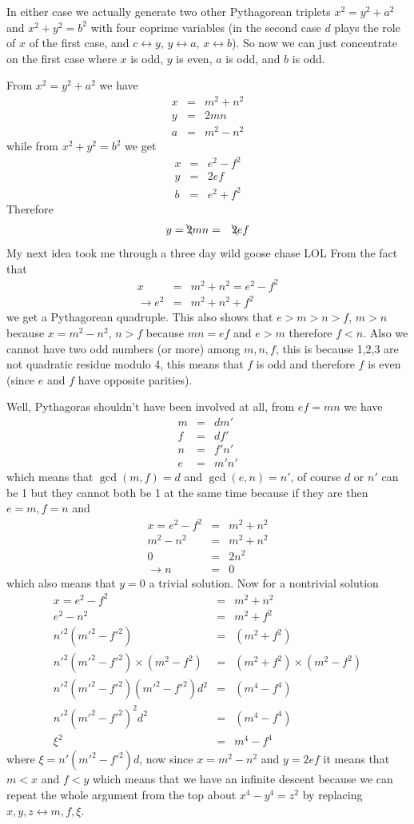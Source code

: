 \documentclass[aps,preprint,preprintnumbers,nofootinbib,showpacs,prd]{revtex4-1}
\newcommand{\nbea}{\begin{eqnarray*}}
\newcommand{\neea}{\end{eqnarray*}}
\begin{document}
In either case we actually generate two other Pythagorean triplets $x^2 = y^2 + a^2$ and $x^2 + y^2 = b^2$ with four coprime variables (in the second case $d$ plays the role of $x$ of the first case, and $c \leftrightarrow y$, $y \leftrightarrow a$, $x \leftrightarrow b$). So now we can just concentrate on the first case where $x$ is odd, $y$ is even, $a$ is odd, and $b$ is odd.

From $x^2 = y^2 + a^2$ we have 
%
\nbea
x & = & m^2 + n^2 \\
y & = & 2mn \\
a & = & m^2 - n^2
\neea
%
while from $x^2 + y^2 = b^2$ we get
%
\nbea
x & = & e^2 - f^2 \\
y & = & 2ef \\
b & = & e^2 + f^2
\neea
%
Therefore
%
\nbea
y = \bcancel{2}mn & = & \bcancel{2}ef
\neea
%
My next idea took me through a three day wild goose chase LOL From the fact that
%
\nbea
x & = & m^2 + n ^2 = e^2 - f^2 \\
\to e^2 & = & m^2 + n ^2 + f^2
\neea
%
we get a Pythagorean quadruple. This also shows that $e > m > n > f$, $m > n$ because $x = m^2 - n^2$, $n > f$ because $mn = ef$ and $e > m$ therefore $f < n$. Also we cannot have two odd numbers (or more) among $m,n,f$, this is because 1,2,3 are not quadratic residue modulo 4, this means that $f$ is odd and therefore $f$ is even (since $e$ and $f$ have opposite parities).

Well, Pythagoras shouldn't have been involved at all, from $ef = mn$ we have
%
\nbea
m & = & dm' \\
f & = & df' \\
n & = & f' n' \\
e & = & m'n'
\neea
%
which means that $\gcd(m,f) = d$ and $\gcd(e,n) = n'$, of course $d$ or $n'$ can be 1 but they cannot both be 1 at the same time because if they are then $e = m, f = n$ and 
%
\nbea
x = e^2 - f^2 & = & m^2 + n^2 \\
m^2 - n^2 & = & m^2 + n^2 \\
0 & = & 2n^2 \\
\to n & = & 0
\neea
%
which also means that $y=0$ a trivial solution. Now for a nontrivial solution
%
\nbea
x = e^2 - f^2 & = & m^2 + n^2 \\
e^2 - n^2 & = & m^2 + f^2 \\
n'^2(m'^2 - f'^2) & = & (m^2 + f^2) \\
n'^2(m'^2 - f'^2)\times(m^2-f^2) & = & (m^2 + f^2)\times(m^2 - f^2) \\
n'^2(m'^2 - f'^2)(m'^2-f'^2) d^2 & = & (m^4 - f^4) \\
n'^2(m'^2 - f'^2)^2d^2 & = & (m^4 - f^4) \\
\xi^2 & = & m^4 - f^4
\neea
%
where $\xi = n'(m'^2-f'^2)d$, now since $x = m^2 - n^2$ and $y = 2ef$ it means that $m < x$ and $f < y$ which means that we have an infinite descent because we can repeat the whole argument from the top about $x^4-y^4=z^2$ by replacing $x,y,z \leftrightarrow m,f,\xi$.
\end{document}
